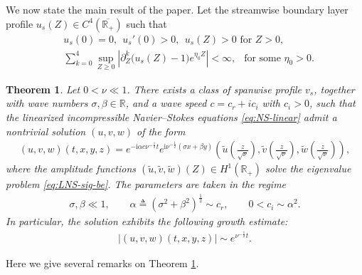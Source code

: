 \documentclass[reqno,11pt]{amsart}
\numberwithin{equation}{section}
\numberwithin{equation}{section}
\theoremstyle{plain}
\newtheorem{theorem}{Theorem}[section]
\begin{document}
We now state the main result of the paper. Let the streamwise boundary layer profile $u_s(Z)\in C^4(\overline{\mathbb{R}_+})$ such that
\begin{align}
	&u_s(0)=0,~~u_s'(0)>0,~~u_s(Z)>0 \text{ for }Z>0,\nonumber\\
	&\sum_{k=0}^4\sup_{Z\geq 0}\left|\partial_Z^k\big(u_s(Z)-1\big)e^{\eta_0Z}\right|<\infty,~~\text{ for some }\eta_0>0.\nonumber
\end{align}
\begin{theorem}\label{main-result}
   Let $0<\nu\ll 1$. There exists a class of spanwise profile $v_s$, together with wave numbers $\sigma,\beta\in \mathbb{R}$, and a wave speed $c=c_r+ic_i$ with $c_i>0$,
   such that the linearized incompressible Navier–Stokes equations  \eqref{eq:NS-linear} admit a nontrivial solution $(u,v,w)$ of the form 
   \begin{align*}
   	(u,v,w)(t,x,y,z)=e^{-\mathrm i\alpha c\nu^{-\frac{1}{2}}t}e^{\mathrm i\nu^{-\frac{1}{2}}  (\sigma x+\beta y)}\left(\tilde{u}(\frac{z}{\sqrt{\nu}}),\tilde{v}(\frac{z}{\sqrt{\nu}}),\tilde{w}(\frac{z}{\sqrt{\nu}})\right),
   \end{align*}
   where the amplitude functions
   $(\tilde{u},\tilde{v},\tilde{w})(Z)\in H^1(\mathbb{R}_+)$ solve the eigenvalue problem \eqref{eq:LNS-sig-be}. The parameters are taken in the regime
   \begin{align}\label{r}
   \sigma, \beta\ll 1,\qquad
   \alpha\triangleq(\sigma^2+\beta^2)^{\frac{1}{2}}\sim c_r,\qquad 0<c_i\sim \alpha^2.
   \end{align}
   In particular, the solution exhibits the following growth estimate:
   \begin{align}
   	|(u,v,w)(t,x,y,z)|\sim e^{\nu^{-\frac{1}{2}}t}.\label{gr}
   \end{align}
\end{theorem}


Here we give several remarks on Theorem \ref{main-result}.
\end{document}
